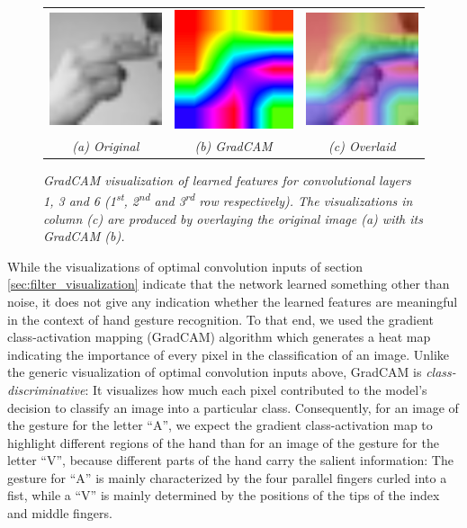 \documentclass[a4paper]{article}
\newcommand{\ts}{\textsuperscript}
\begin{document}
\begin{figure}[t]
\begin{tabular}{ccc}
          \includegraphics[width=.25\linewidth]{graphics/gradcam/layer6/1_original}&\includegraphics[width=.25\linewidth]{graphics/gradcam/layer6/1_map}&\includegraphics[width=.25\linewidth]{graphics/gradcam/layer6/1_overlaid} \\
          \textit{(a) Original} & \textit{(b) GradCAM} & \textit{(c) Overlaid}
     \end{tabular}
     \caption{\textit{GradCAM visualization of learned features for convolutional layers 1, 3 and 6 (1\ts{st}, 2\ts{nd} and 3\ts{rd} row respectively). The visualizations in column (c) are produced by overlaying the original image (a) with its GradCAM (b).}}
     \label{fig:gradcam}
\end{figure}
While the visualizations of optimal convolution inputs of section \ref{sec:filter_visualization} indicate that the network learned something other than noise, it does not give any indication whether the learned features are meaningful in the context of hand gesture recognition. To that end, we used the gradient class-activation mapping (GradCAM) algorithm \cite{Selvaraju2016} which generates a heat map indicating the importance of every pixel in the classification of an image. Unlike the generic visualization of optimal convolution inputs above, GradCAM is \textit{class-discriminative}: It visualizes how much each pixel contributed to the model's decision to classify an image into a particular class. Consequently, for an image of the gesture for the letter \enquote{A}, we expect the gradient class-activation map to highlight different regions of the hand than for an image of the gesture for the letter \enquote{V}, because different parts of the hand carry the salient information: The gesture for \enquote{A} is mainly characterized by the four parallel fingers curled into a fist, while a \enquote{V} is mainly determined by the positions of the tips of the index and middle fingers.\\
\end{document}
